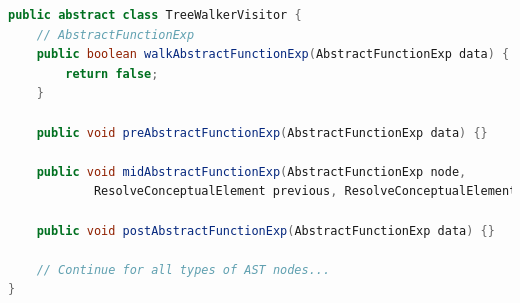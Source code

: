 \documentclass[times]{speauth}
\begin{document}
\begin{lstlisting}[language=java,caption={TreeWalkerVisitor.java}]
public abstract class TreeWalkerVisitor {
    // AbstractFunctionExp
    public boolean walkAbstractFunctionExp(AbstractFunctionExp data) {
        return false;
    }

    public void preAbstractFunctionExp(AbstractFunctionExp data) {}

    public void midAbstractFunctionExp(AbstractFunctionExp node,
            ResolveConceptualElement previous, ResolveConceptualElement next) {}

    public void postAbstractFunctionExp(AbstractFunctionExp data) {}

    // Continue for all types of AST nodes...
}

\end{lstlisting}
\end{document}
